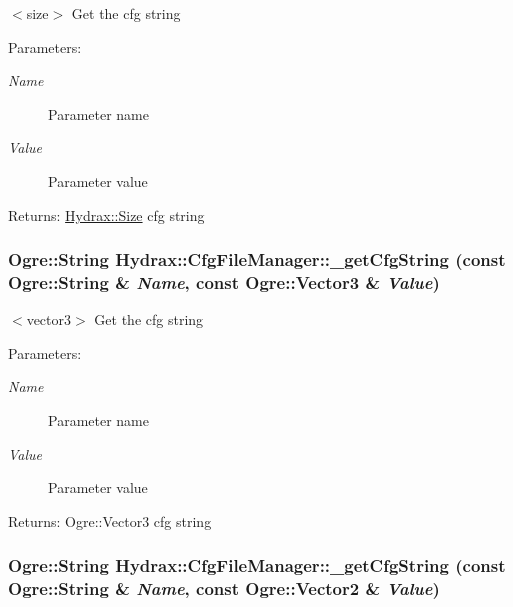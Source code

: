 $<$size$>$ Get the cfg string \begin{Desc}
\item[Parameters:]
\begin{description}
\item[{\em Name}]Parameter name \item[{\em Value}]Parameter value \end{description}
\end{Desc}
\begin{Desc}
\item[Returns:]\hyperlink{struct_hydrax_1_1_size}{Hydrax::Size} cfg string \end{Desc}
\hypertarget{class_hydrax_1_1_cfg_file_manager_843c4e461bdd3d70b449c3b941684209}{
\subsubsection[{\_\-getCfgString}]{\setlength{\rightskip}{0pt plus 5cm}Ogre::String Hydrax::CfgFileManager::\_\-getCfgString (const Ogre::String \& {\em Name}, \/  const Ogre::Vector3 \& {\em Value})}}
\label{class_hydrax_1_1_cfg_file_manager_843c4e461bdd3d70b449c3b941684209}


$<$vector3$>$ Get the cfg string \begin{Desc}
\item[Parameters:]
\begin{description}
\item[{\em Name}]Parameter name \item[{\em Value}]Parameter value \end{description}
\end{Desc}
\begin{Desc}
\item[Returns:]Ogre::Vector3 cfg string \end{Desc}
\hypertarget{class_hydrax_1_1_cfg_file_manager_a5ade5614a7f6958e0df8031fddfac4b}{
\subsubsection[{\_\-getCfgString}]{\setlength{\rightskip}{0pt plus 5cm}Ogre::String Hydrax::CfgFileManager::\_\-getCfgString (const Ogre::String \& {\em Name}, \/  const Ogre::Vector2 \& {\em Value})}}
\label{class_hydrax_1_1_cfg_file_manager_a5ade5614a7f6958e0df8031fddfac4b}


